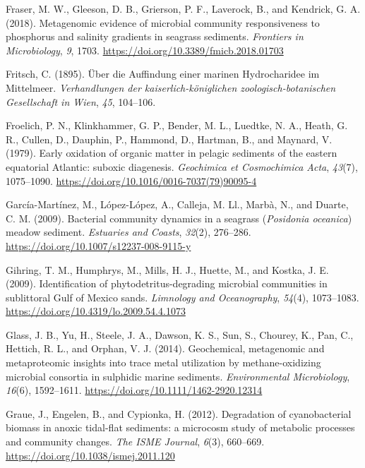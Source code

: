 \documentclass[
  12 pt,
]{book}
\newlength{\cslhangindent}
\newlength{\cslentryspacingunit} %
\newenvironment{CSLReferences}[2] %
 {%
  \setlength{\parindent}{0pt}
  \ifodd #1
  \let\oldpar\par
  \def\par{\hangindent=\cslhangindent\oldpar}
  \fi
  \setlength{\parskip}{#2\cslentryspacingunit}
 }%
 {}
\begin{document}
\begin{CSLReferences}{1}{0}
\leavevmode{}%
Fraser, M. W., Gleeson, D. B., Grierson, P. F., Laverock, B., and Kendrick, G. A. (2018). Metagenomic evidence of microbial community responsiveness to phosphorus and salinity gradients in seagrass sediments. \emph{Frontiers in Microbiology}, \emph{9}, 1703. \url{https://doi.org/10.3389/fmicb.2018.01703}

\leavevmode{}%
Fritsch, C. (1895). Über die Auffindung einer marinen Hydrocharidee im Mittelmeer. \emph{Verhandlungen der kaiserlich-königlichen zoologisch-botanischen Gesellschaft in Wien}, \emph{45}, 104--106.

\leavevmode{}%
Froelich, P. N., Klinkhammer, G. P., Bender, M. L., Luedtke, N. A., Heath, G. R., Cullen, D., Dauphin, P., Hammond, D., Hartman, B., and Maynard, V. (1979). Early oxidation of organic matter in pelagic sediments of the eastern equatorial {Atlantic}: suboxic diagenesis. \emph{Geochimica et Cosmochimica Acta}, \emph{43}(7), 1075--1090. \url{https://doi.org/10.1016/0016-7037(79)90095-4}

\leavevmode{}%
García-Martínez, M., López-López, A., Calleja, M. Ll., Marbà, N., and Duarte, C. M. (2009). Bacterial community dynamics in a seagrass ({{\emph{Posidonia oceanica}}}) meadow sediment. \emph{Estuaries and Coasts}, \emph{32}(2), 276--286. \url{https://doi.org/10.1007/s12237-008-9115-y}

\leavevmode{}%
Gihring, T. M., Humphrys, M., Mills, H. J., Huette, M., and Kostka, J. E. (2009). Identification of phytodetritus-degrading microbial communities in sublittoral {Gulf} of {Mexico} sands. \emph{Limnology and Oceanography}, \emph{54}(4), 1073--1083. \url{https://doi.org/10.4319/lo.2009.54.4.1073}

\leavevmode{}%
Glass, J. B., Yu, H., Steele, J. A., Dawson, K. S., Sun, S., Chourey, K., Pan, C., Hettich, R. L., and Orphan, V. J. (2014). Geochemical, metagenomic and metaproteomic insights into trace metal utilization by methane-oxidizing microbial consortia in sulphidic marine sediments. \emph{Environmental Microbiology}, \emph{16}(6), 1592--1611. \url{https://doi.org/10.1111/1462-2920.12314}

\leavevmode{}%
Graue, J., Engelen, B., and Cypionka, H. (2012). Degradation of cyanobacterial biomass in anoxic tidal-flat sediments: a microcosm study of metabolic processes and community changes. \emph{The ISME Journal}, \emph{6}(3), 660--669. \url{https://doi.org/10.1038/ismej.2011.120}


\end{CSLReferences}
\end{document}
